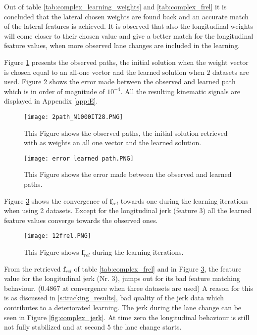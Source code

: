 Out of table \ref{tab:complex_learning_weights} and \ref{tab:complex_frel} it is concluded that the lateral chosen weights are found back and an accurate match of the lateral features is achieved. It is observed that also the longitudinal weights will come closer to their chosen value and give a better match for the longitudinal feature values, when more observed lane changes are included in the learning.

Figure \ref{fig:complex_path} presents the observed paths, the initial solution when the weight vector is chosen equal to an all-one vector and the learned solution when $2$ datasets are used. Figure \ref{fig:complex_path_error} shows the error made between the observed and learned path which is in order of magnitude of $10^{-4}$. All the resulting kinematic signals are displayed in Appendix \ref{app:E}.

\begin{figure}[h!]
	\centering
	\texttt{[image: 2path\_N1000IT28.PNG]}
	\caption{This Figure shows the observed paths, the initial solution retrieved with as weights an all one vector and the learned solution.}	
	\label{fig:complex_path}
\end{figure}

\begin{figure}[h!]
	\centering
	\texttt{[image: error learned path.PNG]}
	\caption{This Figure shows the error made between the observed and learned paths.}	
	\label{fig:complex_path_error}
\end{figure}

Figure \ref{fig:complex_convergence} shows the convergence of $\bm{f}_{rel}$ towards one during the learning iterations when using 2 datasets. Except for the longitudinal jerk (feature $3$) all the learned feature values converge towards the observed ones.

\begin{figure}[h!]
	\centering
	\texttt{[image: 12frel.PNG]}
	\caption{This Figure shows $\bm{f}_{rel}$ during the learning iterations.}	
	\label{fig:complex_convergence}
\end{figure}

From the retrieved $\bm{f}_{rel}$ of table \ref{tab:complex_frel} and in Figure \ref{fig:complex_convergence}, the feature value for the longitudinal jerk (Nr. $3$), jumps out for its bad feature matching behaviour. ($0.4867$ at convergence when three datasets are used) A reason for this is as discussed in \ref{s:tracking_results}, bad quality of the jerk data which contributes to a deteriorated learning. The jerk during the lane change can be seen in Figure \ref{fig:complex_jerk}. At time zero the longitudinal behaviour is still not fully stabilized and at second $5$ the lane change starts.

